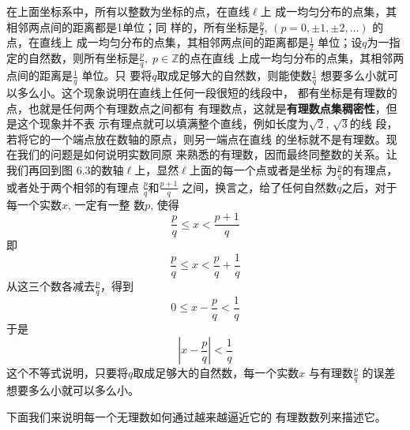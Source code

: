 \begin{figure}[htp]
    \centering
{}
    \caption{}
\end{figure}

在上面坐标系中，所有以整数为坐标的点，在直线$\ell$上
成一均匀分布的点集，其相邻两点间的距离都是1单位；同
样的，所有坐标是$\frac{p}{2}$, $(p=0,\pm1,\pm2,\ldots)$
的点，在直线上
成一均匀分布的点集，其相邻两点间的距离都是$\frac{1}{2}$
单位；设$q$为一指定的自然数，则所有坐标是$\frac{p}{q},\; p\in\mathbb{Z}$的点在直线
上成一均匀分布的点集，其相邻两点间的距离是$\frac{1}{q}$
单位。只
要将$q$取成足够大的自然数，则能使数$\frac{1}{q}$
想要多么小就可
以多么小。这个现象说明在直线上任何一段很短的线段中，
都有坐标是有理数的点，也就是任何两个有理数点之间都有
有理数点，这就是\textbf{有理数点集稠密性}，但是这个现象并不表
示有理点就可以填满整个直线，例如长度为$\sqrt{2}$, $\sqrt{3}$的线
段，若将它的一个端点放在数轴的原点，则另一端点在直线
的坐标就不是有理数。现在我们的问题是如何说明实数同原
来熟悉的有理数，因而最终同整数的关系。让我们再回到图
6.3的数轴$\ell$上，显然$\ell$上面的每一个点或者是坐标
为$\frac{p}{q}$的有理点，或者处于两个相邻的有理点
$\frac{p}{q}$和$\frac{p+1}{q}$
之间，换言之，给了任何自然数$q$之后，对于每一个实数$x$, 一定有一整
数$p$, 使得
\[\frac{p}{q}\le x<\frac{p+1}{q}\]
即
\[\frac{p}{q}\le x<\frac{p}{q}+\frac{1}{q}\]
从这三个数各减去$\frac{p}{q}$，得到
\[0\le x-\frac{p}{q}<\frac{1}{q}\]
于是
\[\left|x-\frac{p}{q}\right|<\frac{1}{q}\]
这个不等式说明，只要将$q$取成足够大的自然数，每一个实数$x$
与有理数$\frac{p}{q}$
的误差想要多么小就可以多么小。

下面我们来说明每一个无理数如何通过越来越逼近它的
有理数数列来描述它。
















\begin{example}
    
\end{example}


